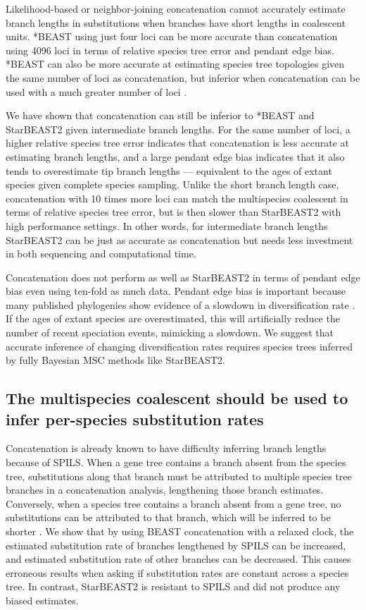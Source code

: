 \documentclass[nogrid]{MBE}%
\begin{document}
Likelihood-based or neighbor-joining concatenation cannot accurately
estimate branch lengths in substitutions when branches have short lengths in coalescent units.
*BEAST using just four loci can be more accurate than
concatenation using 4096 loci in terms of relative species tree error and
pendant edge bias. *BEAST can also be more accurate at estimating species tree
topologies given the same number of loci as concatenation, but inferior when
concatenation can be used with a much greater number of loci
\citep{Ogilvie01052016}.

We have shown that concatenation can still be inferior to *BEAST and StarBEAST2
given intermediate branch lengths. For the same number of loci, a higher
relative species tree error indicates that concatenation is less accurate at
estimating branch lengths, and a large pendant edge bias indicates that
it also tends to overestimate tip branch lengths --- equivalent to the
ages of extant species given complete species sampling. Unlike the short branch
length case, concatenation with 10 times more loci can match the multispecies
coalescent in
terms of relative species tree error, but is then slower than StarBEAST2 with
high performance settings. In other words, for intermediate branch lengths
StarBEAST2 can be just as accurate as concatenation but needs less investment in
both sequencing and computational time.

Concatenation does not perform as well as StarBEAST2 in terms of pendant edge bias
even using ten-fold as much data.
Pendant edge bias is important because many published phylogenies show evidence
of a slowdown in diversification rate \citep{Moen2014190}. If the ages of extant
species are overestimated, this will artificially reduce the number of recent
speciation events, mimicking a slowdown. We suggest that accurate inference of
changing diversification rates requires species trees inferred by fully Bayesian MSC methods
like StarBEAST2.

\subsection{The multispecies coalescent should be used to infer per-species substitution rates}

Concatenation is already known to have difficulty inferring branch lengths
because of SPILS. When a gene tree contains a branch absent from the species
tree, substitutions along that branch must be attributed to multiple species tree
branches in a concatenation analysis, lengthening those branch estimates. Conversely,
when a species tree contains a branch absent from a gene tree, no substitutions
can be attributed to that branch, which will be inferred to be shorter \citep{Mendes01072016}.
We show that by using BEAST concatenation with a relaxed
clock, the estimated substitution rate of branches lengthened by
SPILS can be increased, and estimated substitution rate of other
branches can be decreased. This causes erroneous results when asking if substitution rates
are constant across a species tree. In contrast, StarBEAST2 is resistant to
SPILS and did not produce any biased estimates.
\end{document}
